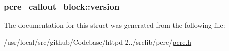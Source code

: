 \subsubsection[{\texorpdfstring{version}{version}}]{ pcre\+\_\+callout\+\_\+block\+::version}\hypertarget{structpcre__callout__block_ab8744d79c7a630e6edc959c0448dd6c6}{}\label{structpcre__callout__block_ab8744d79c7a630e6edc959c0448dd6c6}


The documentation for this struct was generated from the following file\+:\begin{DoxyCompactItemize}
\item 
/usr/local/src/github/\+Codebase/httpd-\/2../srclib/pcre/\hyperlink{pcre_8h}{pcre.\+h}\end{DoxyCompactItemize}
